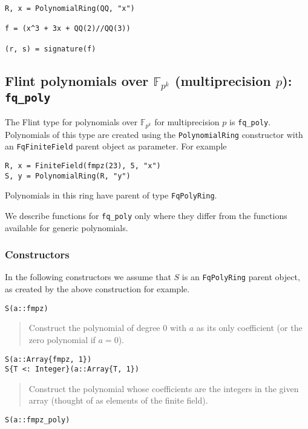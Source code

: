 \documentclass[a4paper,10pt]{article}
\newcommand{\F}{\mathbb{F}}
\newcommand{\code}{\lstinline}
\newcommand{\desc}[1]{\vspace{-3mm}\begin{quote}#1\end{quote}}
\begin{document}
{{\begin{lstlisting}
R, x = PolynomialRing(QQ, "x")

f = (x^3 + 3x + QQ(2)//QQ(3))

(r, s) = signature(f)
\end{lstlisting}

\subsection{Flint polynomials over $\F_{p^k}$ (multiprecision $p$): \code{fq_poly}}

The Flint type for polynomials over $\F_{p^k}$ for multiprecision $p$ is \code{fq_poly}.
Polynomials of this type are created using the \code{PolynomialRing} constructor with
an \code{FqFiniteField} parent object as parameter. For example

\begin{lstlisting}
R, x = FiniteField(fmpz(23), 5, "x")
S, y = PolynomialRing(R, "y")
\end{lstlisting}

Polynomials in this ring have parent of type \code{FqPolyRing}.

We describe functions for \code{fq_poly} only where they differ from the functions
available for generic polynomials.

\subsubsection{Constructors}

In the following constructors we assume that $S$ is an \code{FqPolyRing} parent 
object, as created by the above construction for example.

\begin{lstlisting}
S(a::fmpz)
\end{lstlisting}

\desc{Construct the polynomial of degree $0$ with $a$ as its only coefficient (or
the zero polynomial if $a = 0$).}

\begin{lstlisting}
S(a::Array{fmpz, 1})
S{T <: Integer}(a::Array{T, 1})
\end{lstlisting}

\desc{Construct the polynomial whose coefficients are the integers in the given
array (thought of as elements of the finite field).}

\begin{lstlisting}
S(a::fmpz_poly)
\end{lstlisting}

}}
\end{document}
